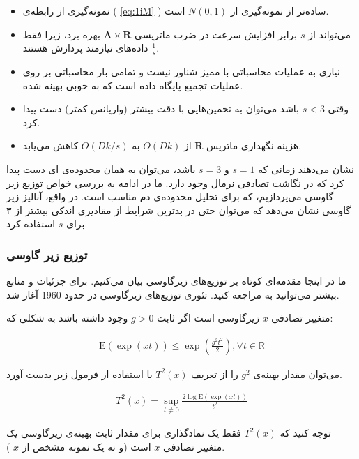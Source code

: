 \begin{itemize}
\item
نمونه‌گیری از رابطه‌ی (%
\ref{eq:1iM}%
) ساده‌تر از نمونه‌گیری از
$N(0,1)$
است.
\item
می‌تواند از 
$s$
برابر افزایش سرعت در ضرب ماتریسی 
$\mathbf{A} \times \mathbf{R}$
بهره برد، زیرا فقط
$\frac{1}{s}$
داده‌های نیازمند پردازش هستند.
\item
نیازی به عملیات محاسباتی با ممیز شناور نیست و تمامی بار محاسباتی بر روی عملیات تجمیع پایگاه داده است که به خوبی بهینه شده.
\item
وقتی 
$s<3$
باشد می‌توان به تخمین‌هایی با دقت بیشتر (واریانس کمتر) دست پیدا کرد.
\item
هزینه نگهداری ماتریس 
$\mathbf{R}$
از 
$O(Dk)$
به 
$O(Dk/s)$
کاهش می‌یابد.
\end{itemize}

\cite{litez2, litez3}
نشان ‌می‌دهند زمانی که 
$s=1$
و 
$s=3$
باشد، می‌توان به همان محدوده‌ی 
ای دست پیدا کرد که در نگاشت تصادفی نرمال وجود دارد. ما در ادامه به بررسی خواص توزیع زیر گاوسی می‌پردازیم، که برای تحلیل محدوده‌ی دم مناسب است. در واقع، آنالیز زیر گاوسی نشان می‌دهد که می‌توان حتی در بدترین شرایط از مقادیری اندکی بیشتر از ۳ برای 
$s$
استفاده کرد.

\subsubsection{
توزیع زیر گاوسی
}

ما در اینجا مقدمه‌ای کوتاه بر توزیع‌های زیرگاوسی بیان می‌کنیم. برای جزئیات و منابع بیشتر می‌توانید به
\cite{litez40}
مراجعه کنید. تئوری توزیع‌های زیرگاوسی در حدود 1960 آغاز شد.

متغییر تصادفی 
$x$
زیرگاوسی است اگر ثابت 
$g > 0$
وجود داشته باشد به شکلی که:

\begin{align}
\mathrm{E}(\exp (xt)) \leq \exp \left( \frac{g^2 t^2}{2} \right), \forall t \in \mathbb{R}
\label{eq:1iN}
\end{align}

می‌توان مقدار بهینه‌ی 
$g^2$ 
را از تعریف 
$T^2(x)$
با استفاده از فرمول زیر بدست آورد.

\begin{align}
T^2(x) = \sup_{t \neq 0} \frac{2 \log \mathrm{E}\left(\exp(xt)\right)}{t^2}
\label{eq:1iP}
\end{align}

توجه کنید که 
$T^2(x)$
فقط یک نمادگذاری برای مقدار ثابت بهینه‌ی زیرگاوسی یک متغییر تصادفی 
$x$
است (و نه یک نمونه مشخص از 
$x$
).

